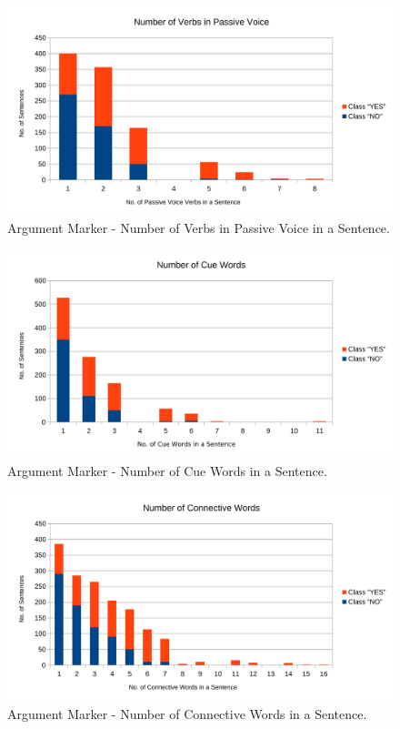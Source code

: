 \begin{figure}[H]
\centering
\includegraphics[width=0.8\linewidth]{figure/arguments/A_pv_verbs1.pdf}
\caption{Argument Marker - Number of Verbs in Passive Voice in a Sentence.}
\end{figure}

\begin{figure}[H]
\centering
\includegraphics[width=0.8\linewidth]{figure/arguments/A_cue_words1.pdf}
\caption{Argument Marker - Number of Cue Words in a Sentence.}
\end{figure}

\begin{figure}[H]
\centering
\includegraphics[width=0.8\linewidth]{figure/arguments/A_connective1.pdf}
\caption{Argument Marker - Number of Connective Words in a Sentence.}
\end{figure}

